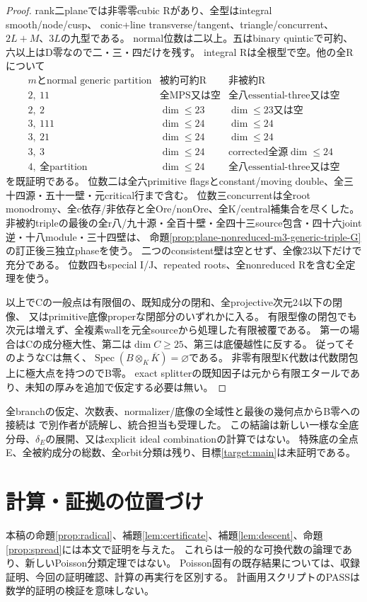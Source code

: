 \documentclass[a4paper,11pt]{ltjsarticle}
\theoremstyle{definition}
\newcommand{\Spec}{\operatorname{Spec}}
\begin{document}
\begin{proof}
rank二planeでは非零零cubic Rがあり、全型はintegral smooth/node/cusp、
conic+line transverse/tangent、triangle/concurrent、$2L+M$、$3L$の九型である。
normal位数は二以上。五はbinary quinticで可約、六以上はD零なので二・三・四だけを残す。
integral Rは全根型で空。他の全Rについて
\[
\begin{array}{c|c|c}
 m\text{とnormal generic partition}&\text{被約可約R}&\text{非被約R}\\\hline
 2,\ 11&\text{全MPS又は空}&\text{全八essential-three又は空}\\
 2,\ 2&\dim\le23&\dim\le23\text{又は空}\\
 3,\ 111&\dim\le24&\dim\le24\\
 3,\ 21&\dim\le24&\dim\le24\\
 3,\ 3&\dim\le24&\text{corrected全源}\dim\le24\\
 4,\ \text{全partition}&\dim\le24&\text{全八essential-three又は空}
\end{array}
\]
を既証明である。
位数二は全六primitive flagsとconstant/moving double、全三十四源・五十一壁・元critical行まで含む。
位数三concurrentは全root monodromy、全c依存/非依存と全Ore/nonOre、全K/central補集合を尽くした。
非被約tripleの最後の全r八/九十源・全百十壁・全四十三source包含・四十六joint逆・十八module・三十四壁は、
命題\ref{prop:plane-nonreduced-m3-generic-triple-G}の訂正後三独立phaseを使う。
二つのconsistent壁は空とせず、全像23以下だけで充分である。
位数四もspecial I/J、repeated roots、全nonreduced Rを含む全定理を使う。

以上でCの一般点は有限個の、既知成分の閉和、全projective次元24以下の閉像、
又はprimitive底像properな閉部分のいずれかに入る。
有限型像の閉包でも次元は増えず、全複素wallを元全sourceから処理した有限被覆である。
第一の場合はCの成分極大性、第二は$\dim C\ge25$、第三は底優越性に反する。
従ってそのようなCは無く、$\Spec(B\otimes_K\overline K)=\varnothing$である。
非零有限型K代数は代数閉包上に極大点を持つのでB零。
exact splitterの既知因子は元から有限エタールであり、未知の厚みを追加で仮定する必要は無い。
\end{proof}
全branchの仮定、次数表、normalizer/底像の全域性と最後の幾何点からB零への接続は
で別作者が読解し、統合担当も受理した。
この結論は新しい一様な全底分母、$\delta_E$の展開、又はexplicit ideal combinationの計算ではない。
特殊底の全点E、全被約成分の総数、全orbit分類は残り、目標\ref{target:main}は未証明である。

\section{計算・証拠の位置づけ}
本稿の命題\ref{prop:radical}、補題\ref{lem:certificate}、補題\ref{lem:descent}、命題\ref{prop:spread}には本文で証明を与えた。
これらは一般的な可換代数の論理であり、新しいPoisson分類定理ではない。
Poisson固有の既存結果については、収録証明、今回の証明確認、計算の再実行を区別する。
計画用スクリプトのPASSは数学的証明の検証を意味しない。
\end{document}
